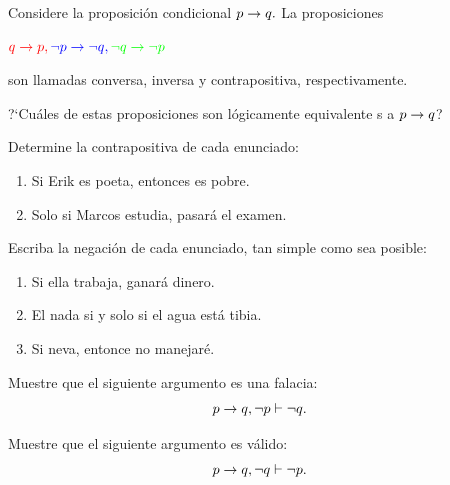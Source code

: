  \begin{problema}
  \label{lip:sol:4.7}
  Considere la proposición condicional $p \rightarrow q.$ La proposiciones 
  \begin{center}
  ${\color{red}q \rightarrow p,} {\color{blue}\, \neg p \rightarrow \neg q,} \, {\color{green}\neg q \rightarrow \neg p}$
  \end{center}
son llamadas {\color{red} conversa,} {\color{blue}inversa} y {\color{green} contrapositiva}, respectivamente.


?`Cuáles de estas proposiciones son lógicamente equivalente s a $p\rightarrow q$?
 \end{problema}




 \begin{problema}
  Determine la contrapositiva de cada enunciado:
  \begin{enumerate}
   \item Si Erik es poeta, entonces es pobre. 
   \item Solo si Marcos estudia, pasará el examen. 
  \end{enumerate}

 \end{problema}




 \begin{problema}
  Escriba la negación de cada enunciado, tan simple como sea posible:
  \begin{enumerate}
   \item Si ella trabaja, ganará dinero. 
   \item El nada si y solo si el agua está tibia. 
   \item Si neva, entonce no manejar\'e.
  \end{enumerate}

 \end{problema}





 \begin{problema}
  Muestre que el siguiente argumento es una falacia:
 $$
 p\rightarrow q, \neg p \vdash \neg q.
 $$
 \end{problema}




 \begin{problema}
  Muestre que el siguiente argumento es válido:
 $$
 p\rightarrow q, \neg q \vdash \neg p.
 $$
 \end{problema}




